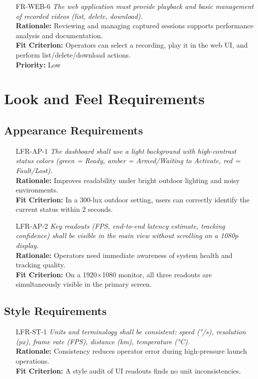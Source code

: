 \documentclass[12pt]{article}
\begin{document}
\begin{itemize}
  \item[FR-WEB-6] \emph{The web application must provide playback and basic management
          of recorded videos (list, delete, download).}\\[2mm]
        {\bf Rationale:} Reviewing and managing captured sessions supports performance analysis and documentation.\\
        {\bf Fit Criterion:} Operators can select a recording, play it in the web UI, and perform list/delete/download actions.\\
        {\bf Priority:} Low

\end{itemize}
\section{Look and Feel Requirements}
\subsection{Appearance Requirements}
\begin{itemize}[leftmargin=*]
  \item[LFR-AP-1] \emph{The dashboard shall use a light background with high-contrast
          status colors (green = Ready, amber = Armed/Waiting to Activate, red =
          Fault/Lost).}\\ \textbf{Rationale:} Improves readability under bright outdoor
        lighting and noisy environments.\\ \textbf{Fit Criterion:} In a 300-lux outdoor
        setting, users can correctly identify the current status within 2 seconds.

  \item[LFR-AP-2] \emph{Key readouts (FPS, end-to-end latency estimate, tracking
          confidence) shall be visible in the main view without scrolling on a 1080p
          display.}\\ \textbf{Rationale:} Operators need immediate awareness of system
        health and tracking quality.\\ \textbf{Fit Criterion:} On a 1920×1080 monitor,
        all three readouts are simultaneously visible in the primary screen.
\end{itemize}

\subsection{Style Requirements}
\begin{itemize}[leftmargin=*]
  \item[LFR-ST-1] \emph{Units and terminology shall be consistent: speed (°/s),
          resolution (px), frame rate (FPS), distance (km), temperature (°C).}\\
        \textbf{Rationale:} Consistency reduces operator error during high-pressure
        launch operations.\\ \textbf{Fit Criterion:} A style audit of UI readouts finds
        no unit inconsistencies.
\end{itemize}
\end{document}
